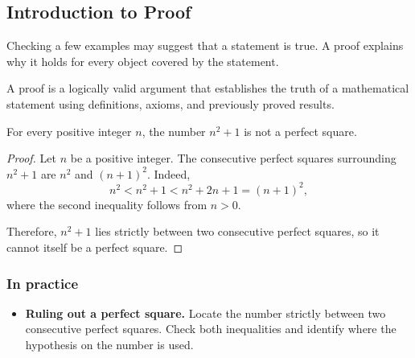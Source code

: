 
\subsection{Introduction to Proof}
Checking a few examples may suggest that a statement is true. A proof
explains why it holds for every object covered by the statement.

\begin{definition}[Proof]
A proof is a logically valid argument that establishes the truth of a mathematical statement using definitions, axioms, and previously proved results.
\end{definition}

\begin{proposition}
For every positive integer $n$, the number $n^2 + 1$ is not a perfect square.
\end{proposition}

\begin{proof}
Let $n$ be a positive integer. The consecutive perfect squares surrounding $n^2 + 1$ are $n^2$ and $(n+1)^2$. Indeed,
\begin{equation*}
    n^2 < n^2 + 1 < n^2 + 2n + 1 = (n+1)^2,
\end{equation*}
where the second inequality follows from $n > 0$.

Therefore, $n^2 + 1$ lies strictly between two consecutive perfect squares, so it cannot itself be a perfect square.
\end{proof}

\subsubsection*{In practice}
\begin{itemize}
    \item \textbf{Ruling out a perfect square.} Locate the number strictly
    between two consecutive perfect squares. Check both inequalities and
    identify where the hypothesis on the number is used.
\end{itemize}
